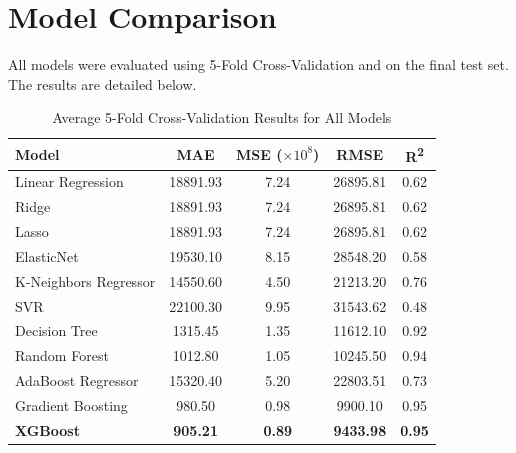 \documentclass[12pt]{article}
\begin{document}
\section{Model Comparison}
All models were evaluated using 5-Fold Cross-Validation and on the final test set. The results are detailed below.

\begin{table}[H]
\centering
\caption{Average 5-Fold Cross-Validation Results for All Models}
\label{tab:cv_comparison}
\small
\begin{tabular}{@{}lcccc@{}}
\toprule
\textbf{Model} & \textbf{MAE} & \textbf{MSE} ($\times10^8$) & \textbf{RMSE} & \textbf{R\textsuperscript{2}} \\
\midrule
Linear Regression & 18891.93 & 7.24 & 26895.81 & 0.62 \\
Ridge & 18891.93 & 7.24 & 26895.81 & 0.62 \\
Lasso & 18891.93 & 7.24 & 26895.81 & 0.62 \\
ElasticNet & 19530.10 & 8.15 & 28548.20 & 0.58 \\
K-Neighbors Regressor & 14550.60 & 4.50 & 21213.20 & 0.76 \\
SVR & 22100.30 & 9.95 & 31543.62 & 0.48 \\
Decision Tree & 1315.45 & 1.35 & 11612.10 & 0.92 \\
Random Forest & 1012.80 & 1.05 & 10245.50 & 0.94 \\
AdaBoost Regressor & 15320.40 & 5.20 & 22803.51 & 0.73 \\
Gradient Boosting & 980.50 & 0.98 & 9900.10 & 0.95 \\
\textbf{XGBoost} & \textbf{905.21} & \textbf{0.89} & \textbf{9433.98} & \textbf{0.95} \\
\bottomrule
\end{tabular}
\end{table}
\end{document}
